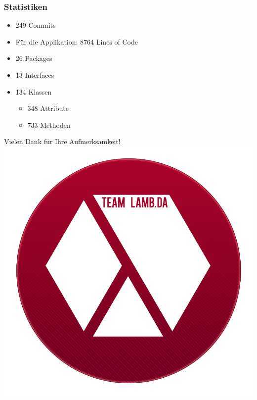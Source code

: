 \documentclass[18pt]{beamer}
\begin{document}
\begin{frame}
	\frametitle{Statistiken}
	\begin{itemize}
		\item 249 Commits
		\item Für die Applikation: 8764 Lines of Code
		\item 26 Packages
		\item 13 Interfaces
		\item 134 Klassen
		\begin{itemize}
			\item 348 Attribute
			\item 733 Methoden
		\end{itemize}
	\end{itemize}
\end{frame}

\begin{frame}
	\centering
	\huge Vielen Dank für Ihre Aufmerksamkeit!
	\includegraphics[scale=0.8]{team_lambda_lg.png}
\end{frame}
\end{document}
